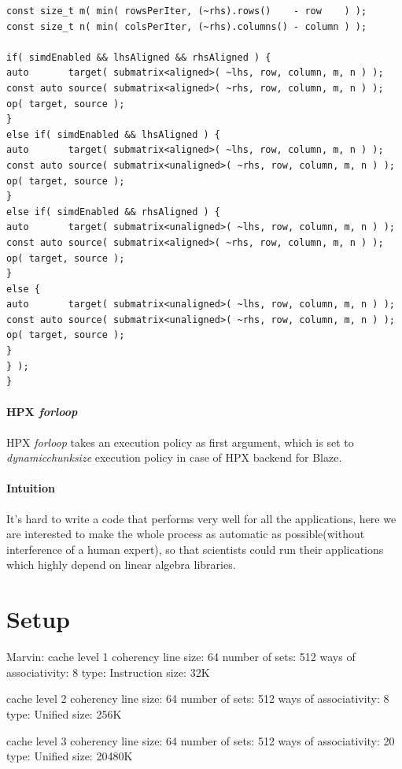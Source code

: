 \begin{lstlisting}[float,floatplacement=H,caption= {New implementation of Assign function for HPX backend in Blaze.}, label={newd_hpx_backend}]
const size_t m( min( rowsPerIter, (~rhs).rows()    - row    ) );
const size_t n( min( colsPerIter, (~rhs).columns() - column ) );

if( simdEnabled && lhsAligned && rhsAligned ) {
auto       target( submatrix<aligned>( ~lhs, row, column, m, n ) );
const auto source( submatrix<aligned>( ~rhs, row, column, m, n ) );
op( target, source );
}
else if( simdEnabled && lhsAligned ) {
auto       target( submatrix<aligned>( ~lhs, row, column, m, n ) );
const auto source( submatrix<unaligned>( ~rhs, row, column, m, n ) );
op( target, source );
}
else if( simdEnabled && rhsAligned ) {
auto       target( submatrix<unaligned>( ~lhs, row, column, m, n ) );
const auto source( submatrix<aligned>( ~rhs, row, column, m, n ) );
op( target, source );
}
else {
auto       target( submatrix<unaligned>( ~lhs, row, column, m, n ) );
const auto source( submatrix<unaligned>( ~rhs, row, column, m, n ) );
op( target, source );
}
} );
}
\end{lstlisting}

\paragraph{HPX \textit{for\textunderscore loop}}
HPX \textit{for\textunderscore loop} takes an execution policy as first argument, which is set to \textit{dynamic\textunderscore chunk\textunderscore size} execution policy in case of HPX backend for Blaze.



\paragraph{Intuition}
It's hard to write a code that performs very well for all the applications, here we are interested to make the whole process as automatic as possible(without interference of a human expert), so that scientists could run their applications which highly depend on linear algebra libraries. 

\section{Setup}
Marvin:
cache level 1
coherency line size: 64
number of sets: 512
ways of associativity: 8
type: Instruction
size: 32K

cache level 2
coherency line size: 64
number of sets: 512
ways of associativity: 8
type: Unified
size: 256K

cache level 3
coherency line size: 64
number of sets: 512
ways of associativity: 20
type: Unified
size: 20480K


